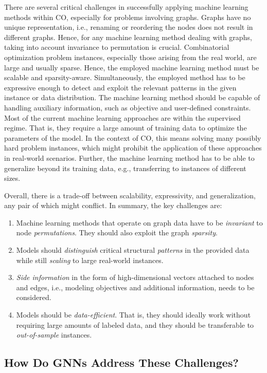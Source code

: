 \documentclass[10pt]{book}
\begin{document}
There are several critical challenges in successfully applying machine learning methods within CO, especially for problems involving graphs. Graphs have no unique representation, i.e., renaming or reordering the nodes does not result in different graphs. Hence, for any machine learning method dealing with graphs, taking into account invariance to permutation is crucial. Combinatorial optimization problem instances, especially those arising from the real world, are large and usually sparse. Hence, the employed machine learning method must be scalable and sparsity-aware. Simultaneously, the employed method has to be expressive enough to detect and exploit the relevant patterns in the given instance or data distribution. The machine learning method should be capable of handling auxiliary information, such as objective and user-defined constraints. Most of the current machine learning approaches are within the supervised regime. That is, they require a large amount of training data to optimize the parameters of the model. In the context of CO, this means solving many possibly hard problem instances, which might prohibit the application of these approaches in real-world scenarios. Further, the machine learning method has to be able to generalize beyond its training data, e.g., transferring to instances of different sizes.

Overall, there is a trade-off between scalability, expressivity, and generalization, any pair of which might conflict. In summary, the key challenges are:
\begin{enumerate}
    \item Machine learning methods that operate on graph data have to be \emph{invariant} to node \emph{permutations}. They should also exploit the graph \emph{sparsity}.
    \item Models should \emph{distinguish} critical structural \emph{patterns} in the provided data while still \emph{scaling} to large real-world instances.
    \item \emph{Side information} in the form of high-dimensional vectors attached to nodes and edges, i.e., modeling objectives and additional information, needs to be considered.
    \item Models should be \emph{data-efficient}. That is, they should ideally work without requiring large amounts of labeled data, and they should be transferable to \emph{out-of-sample} instances.
\end{enumerate}

\subsection{How Do GNNs Address These Challenges?}
\end{document}
